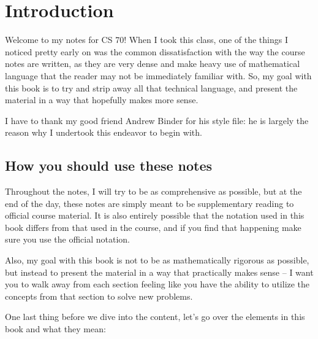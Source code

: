 \chapter{Introduction}
Welcome to my notes for CS 70! When I took this class, one of the things I noticed pretty early on was the common 
dissatisfaction with the way the course notes are written, as they are very dense and make heavy use of 
mathematical language that the reader may not be immediately familiar with. So, my goal with this book 
is to try and strip away all that technical language, and present the material in a way that hopefully makes 
more sense. 

I have to thank my good friend Andrew Binder for his style file: he is largely the reason why I undertook this 
endeavor to begin with.    
\section{How you should use these notes}
Throughout the notes, I will try to be as comprehensive as possible, but at the end of the day, these notes are 
simply meant to be supplementary reading to official course material. It is also entirely possible 
that the notation used in this book differs from that used in the course, and if you find that happening 
make sure you use the official notation.  
 
Also, my goal with this book is not to be as mathematically rigorous as possible, but instead to present the material 
in a way that practically makes sense -- I want you to walk away from each section feeling like you have the ability 
to utilize the concepts from that section to solve new problems.

One last thing before we dive into the content, let's go over the elements in this book and what they mean:


